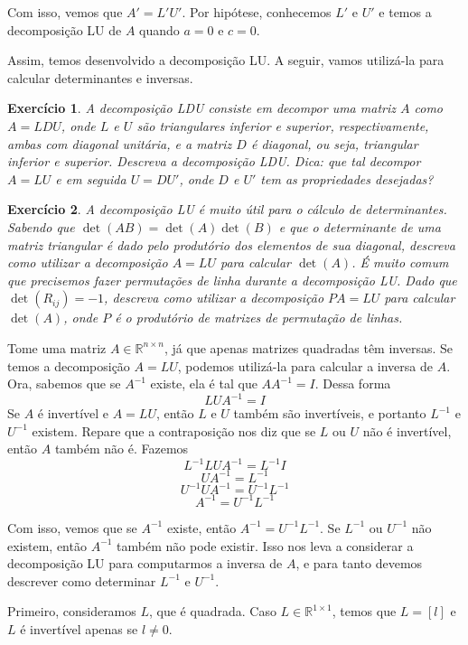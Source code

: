 \documentclass[]{article}
\newtheorem{exercicio}{Exercício}
\numberwithin{equation}{section}
\begin{document}
Com isso, vemos que $A' = L'U'$. Por hipótese, conhecemos $L'$ e $U'$ e temos a decomposição LU de $A$ quando $a = 0$ e $c = 0$.

Assim, temos desenvolvido a decomposição LU. A seguir, vamos utilizá-la para calcular determinantes e inversas.

\begin{exercicio}
	A decomposição LDU consiste em decompor uma matriz $A$ como $A = LDU$, onde $L$ e $U$ são triangulares inferior e superior, respectivamente, ambas com diagonal unitária, e a matriz $D$ é diagonal, ou seja, triangular inferior e superior. Descreva a decomposição LDU. Dica: que tal decompor $A = LU$ e em seguida $U = DU'$, onde $D$ e $U'$ tem as propriedades desejadas?
\end{exercicio}

\begin{exercicio}
	A decomposição LU é muito útil para o cálculo de determinantes. Sabendo que $\det(AB) = \det(A) \det(B)$ e que o determinante de uma matriz triangular é dado pelo produtório dos elementos de sua diagonal, descreva como utilizar a decomposição $A = LU$ para calcular $\det(A)$. É muito comum que precisemos fazer permutações de linha durante a decomposição LU. Dado que $\det(R_{ij}) = -1$, descreva como utilizar a decomposição $PA = LU$ para calcular $\det(A)$, onde $P$ é o produtório de matrizes de permutação de linhas.
\end{exercicio}

Tome uma matriz $A \in \mathbb{R}^{n \times n}$, já que apenas matrizes quadradas têm inversas. Se temos a decomposição $A = LU$, podemos utilizá-la para calcular a inversa de $A$. Ora, sabemos que se $A^{-1}$ existe, ela é tal que $AA^{-1} = I$. Dessa forma
$$
LUA^{-1} = I
$$
Se $A$ é invertível e $A = LU$, então $L$ e $U$ também são invertíveis, e portanto $L^{-1}$ e $U^{-1}$ existem. Repare que a contraposição nos diz que se $L$ ou $U$ não é invertível, então $A$ também não é. Fazemos
$$
L^{-1}LUA^{-1} = L^{-1}I
$$
$$
UA^{-1} = L^{-1}
$$
$$
U^{-1}UA^{-1} = U^{-1}L^{-1}
$$
$$
A^{-1} = U^{-1}L^{-1}
$$

Com isso, vemos que se $A^{-1}$ existe, então $A^{-1} = U^{-1}L^{-1}$. Se $L^{-1}$ ou $U^{-1}$ não existem, então $A^{-1}$ também não pode existir. Isso nos leva a considerar a decomposição LU para computarmos a inversa de $A$, e para tanto devemos descrever como determinar $L^{-1}$ e $U^{-1}$.

Primeiro, consideramos $L$, que é quadrada. Caso $L \in \mathbb{R}^{1 \times 1}$, temos que $L = [l]$ e $L$ é invertível apenas se $l \neq 0$.
\end{document}
